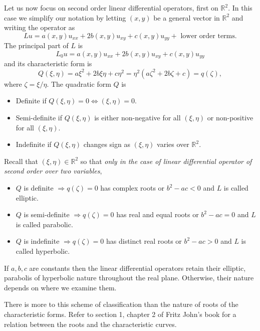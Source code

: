 \documentclass{article}
\theoremstyle{plain}
\numberwithin{thm}{section}
\theoremstyle{plain}
\numberwithin{prop}{section}
\theoremstyle{definition}
\numberwithin{defn}{section}
\theoremstyle{remark}
\numberwithin{equation}{section}
\begin{document}
Let us now focus on second order linear differential operators, first on $\mathbb{R}^2$. In this
case we simplify our notation by letting $(x, y)$ be a general vector in $\mathbb{R}^2$ and 
writing the operator as 
\begin{equation}\label{s19e2}
Lu = a(x, y)u_{xx} + 2b(x, y)u_{xy} + c(x, y)u_{yy} + \text{ lower order terms}.
\end{equation}
The principal part of $L$ is 
\begin{equation}\label{s19e3}
L_0u = a(x, y)u_{xx} + 2b(x, y)u_{xy} + c(x, y)u_{yy}
\end{equation}
and its characteristic form is
\begin{equation}\label{s19e4}
Q(\xi, \eta) = a\xi^2 + 2b\xi\eta + c\eta^2 = \eta^2\left(a\zeta^2 + 2b\zeta + c\right) = q(\zeta),
\end{equation}
where $\zeta = \xi/\eta$. The quadratic form $Q$ is
\begin{itemize}
\item Definite if $Q(\xi, \eta) = 0 \iff (\xi, \eta) = 0$.
\item Semi-definite if $Q(\xi, \eta)$ is either non-negative for all $(\xi, \eta)$ or non-positive
for all $(\xi, \eta)$.
\item Indefinite if $Q(\xi, \eta)$ changes sign as $(\xi, \eta)$ varies over $\mathbb{R}^2$.
\end{itemize}

Recall that $(\xi, \eta) \in \mathbb{R}^2$ so that \emph{only in the case of linear differential
operator of second order over two variables},
\begin{itemize}
\item $Q$ is definite $\Rightarrow q(\zeta) = 0$ has complex roots or $b^2 - ac < 0$ and $L$ is 
called elliptic.
\item $Q$ is semi-definite $\Rightarrow q(\zeta) = 0$ has real and equal roots or $b^2 - ac = 0$ and 
$L$ is called parabolic.
\item $Q$ is indefinite $\Rightarrow q(\zeta) = 0$ has distinct real roots or $b^2 - ac > 0$ and $L$ 
is called hyperbolic.
\end{itemize}

If $a, b, c$ are constants then the linear differential operators retain their elliptic, parabolis of 
hyperbolic nature throughout the real plane. Otherwise, their nature depends on where we examine them.

There is more to this scheme of classification than the nature of roots of the characteristic forms.
Refer to section 1, chapter 2 of Fritz John's book \cite{fj} for a relation between the roots and the 
characteristic curves.
\end{document}
